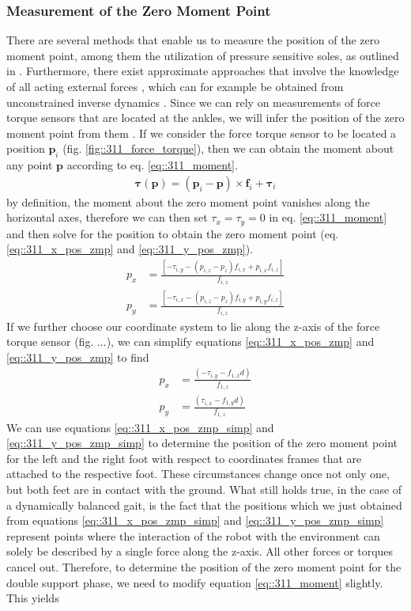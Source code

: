\subsubsection{Measurement of the Zero Moment Point}
There are several methods that enable us to measure the position of the zero moment point, among them the utilization of pressure sensitive soles, as outlined in \cite{kajita2014introduction}. Furthermore, there exist approximate approaches that involve the knowledge of all acting external forces \cite{huang2001planning}, which can for example be obtained from unconstrained inverse dynamics \cite{michel2017dynamic}. Since we can rely on measurements of force torque sensors that are located at the ankles, we will infer the position of the zero moment point from them \cite{kajita2014introduction}. If we consider the force torque sensor to be located a position $\bm{p}_i$ (fig. \ref{fig::311_force_torque}), then we can obtain the moment about any point $\bm{p}$ according to eq. \ref{eq::311_moment}.
\begin{align}
	\bm{\tau}(\bm{p}) = (\bm{p}_i-\bm{p})\times \bm{f}_i + \bm{\tau}_i
	\label{eq::311_moment}
\end{align}
by definition, the moment about the zero moment point vanishes along the horizontal axes, therefore we can then set $\tau_x = \tau_y = 0$ in eq. \ref{eq::311_moment} and then solve for the position to obtain the zero moment point (eq. \ref{eq::311_x_pos_zmp} and \ref{eq::311_y_pos_zmp}).
\begin{align}
	p_x &= \frac{\left[-\tau_{i,y}-(p_{i,z}-p_z)f_{i,x}+p_{i,x}f_{i,z}\right]}{f_{i,z}}
	\label{eq::311_x_pos_zmp}\\
	p_y &= \frac{\left[-\tau_{i,x}-(p_{i,z}-p_z)f_{i,y}+p_{i,y}f_{i,z}\right]}{f_{i,z}}
	\label{eq::311_y_pos_zmp}
\end{align}
If we further choose our coordinate system to lie along the z-axis of the force torque sensor (fig. ...), we can simplify equations \ref{eq::311_x_pos_zmp} and \ref{eq::311_y_pos_zmp} to find
\begin{align}
	p_x &= \frac{(-\tau_{i,y}-f_{1,x}d)}{f_{1,z}} 
	\label{eq::311_x_pos_zmp_simp}\\
	p_y &= \frac{(\tau_{i,x}-f_{1,y}d)}{f_{1,z}}
	\label{eq::311_y_pos_zmp_simp}
\end{align}
We can use equations \ref{eq::311_x_pos_zmp_simp} and \ref{eq::311_y_pos_zmp_simp} to determine the position of the zero moment point for the left and the right foot with respect to coordinates frames that are attached to the respective foot. These circumstances change once not only one, but both feet are in contact with the ground. What still holds true, in the case of a dynamically balanced gait, is the fact that the positions which we just obtained from equations \ref{eq::311_x_pos_zmp_simp} and \ref{eq::311_y_pos_zmp_simp} represent points where the interaction of the robot with the environment can solely be described by a single force along the z-axis. All other forces or torques cancel out. Therefore, to determine the position of the zero moment point for the double support phase, we need to modify equation \ref{eq::311_moment} slightly. This yields 
